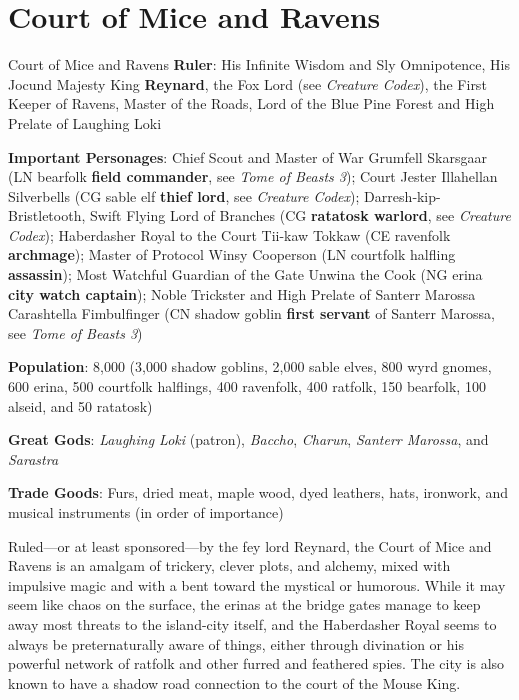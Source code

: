 \documentclass[10pt,a4paper,twoside,bg=print,twocolumn,openany,nodeprecatedcode]{dndbook}
\begin{document}
\section{Court of Mice and Ravens}
\begin{DndSidebar}[float=!b]{Court of Mice and Ravens}
\textbf{Ruler}: His Infinite Wisdom and Sly Omnipotence, His Jocund Majesty King \textbf{Reynard}, the Fox Lord (see \textit{Creature Codex}), the First Keeper of Ravens, Master of the Roads, Lord of the Blue Pine Forest and High Prelate of Laughing Loki



\textbf{Important Personages}: Chief Scout and Master of War Grumfell Skarsgaar (LN bearfolk \textbf{field commander}, see \textit{Tome of Beasts 3}); Court Jester Illahellan Silverbells (CG sable elf \textbf{thief lord}, see \textit{Creature Codex}); Darresh‑kip-Bristletooth, Swift Flying Lord of Branches (CG \textbf{ratatosk warlord}, see \textit{Creature Codex}); Haberdasher Royal to the Court Tii-kaw Tokkaw (CE ravenfolk \textbf{archmage}); Master of Protocol Winsy Cooperson (LN courtfolk halfling \textbf{assassin}); Most Watchful Guardian of the Gate Unwina the Cook (NG erina \textbf{city watch captain}); Noble Trickster and High Prelate of Santerr Marossa Carashtella Fimbulfinger (CN shadow goblin \textbf{first servant} of Santerr Marossa, see \textit{Tome of Beasts 3})



\textbf{Population}: 8,000 (3,000 shadow goblins, 2,000 sable elves, 800 wyrd gnomes, 600 erina, 500 courtfolk halflings, 400 ravenfolk, 400 ratfolk, 150 bearfolk, 100 alseid, and 50 ratatosk)



\textbf{Great Gods}: \textit{Laughing Loki} (patron), \textit{Baccho}, \textit{Charun}, \textit{Santerr Marossa}, and \textit{Sarastra}



\textbf{Trade Goods}: Furs, dried meat, maple wood, dyed leathers, hats, ironwork, and musical instruments (in order of importance)





\end{DndSidebar}

Ruled—or at least sponsored—by the fey lord Reynard, the Court of Mice and Ravens is an amalgam of trickery, clever plots, and alchemy, mixed with impulsive magic and with a bent toward the mystical or humorous. While it may seem like chaos on the surface, the erinas at the bridge gates manage to keep away most threats to the island-city itself, and the Haberdasher Royal seems to always be preternaturally aware of things, either through divination or his powerful network of ratfolk and other furred and feathered spies. The city is also known to have a shadow road connection to the court of the Mouse King.
\end{document}
